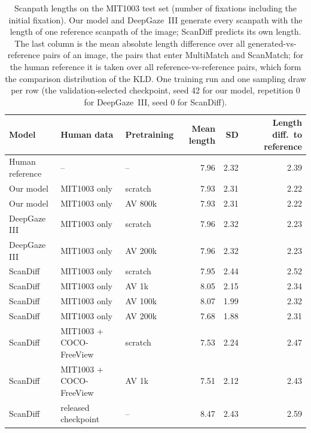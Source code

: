 \begin{table}[t]
  \centering
  \small
  \begin{tabular}{lllrrr}
    \toprule
    Model & Human data & Pretraining & Mean length & SD & Length diff.\ to reference \\
    \midrule
    Human reference & -- & -- & 7.96 & 2.32 & 2.39 \\
    Our model & MIT1003 only & scratch & 7.93 & 2.31 & 2.22 \\
    Our model & MIT1003 only & AV 800k & 7.93 & 2.31 & 2.22 \\
    DeepGaze III & MIT1003 only & scratch & 7.96 & 2.32 & 2.23 \\
    DeepGaze III & MIT1003 only & AV 200k & 7.96 & 2.32 & 2.23 \\
    ScanDiff & MIT1003 only & scratch & 7.95 & 2.44 & 2.52 \\
    ScanDiff & MIT1003 only & AV 1k & 8.05 & 2.15 & 2.34 \\
    ScanDiff & MIT1003 only & AV 100k & 8.07 & 1.99 & 2.32 \\
    ScanDiff & MIT1003 only & AV 200k & 7.68 & 1.88 & 2.31 \\
    ScanDiff & MIT1003 + COCO-FreeView & scratch & 7.53 & 2.24 & 2.47 \\
    ScanDiff & MIT1003 + COCO-FreeView & AV 1k & 7.51 & 2.12 & 2.43 \\
    ScanDiff & released checkpoint & -- & 8.47 & 2.43 & 2.59 \\
    \bottomrule
  \end{tabular}
  \caption{Scanpath lengths on the MIT1003 test set (number of fixations including the initial fixation). Our model and DeepGaze~III generate every scanpath with the length of one reference scanpath of the image; ScanDiff predicts its own length. The last column is the mean absolute length difference over all generated-vs-reference pairs of an image, the pairs that enter MultiMatch and ScanMatch; for the human reference it is taken over all reference-vs-reference pairs, which form the comparison distribution of the KLD. One training run and one sampling draw per row (the validation-selected checkpoint, seed 42 for our model, repetition 0 for DeepGaze~III, seed 0 for ScanDiff).}
  \label{tab:length-statistics}
\end{table}
